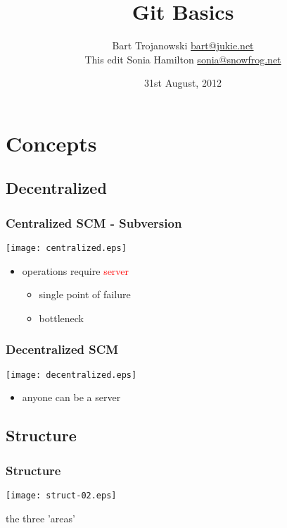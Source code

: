 \documentclass[english]{beamer}
\title{Git Basics}
\author[Bart Trojanowski, Sonia Hamilton]
{Bart Trojanowski \href{mailto:bart@jukie.net}{bart@jukie.net}\\
This edit {Sonia Hamilton \href{mailto:sonia@snowfrog.net}{sonia@snowfrog.net}}}
\institute{Jukie Networks Inc.}
\date{31st August, 2012}
\newcommand{\mysection}[2]{%
  \hypertarget{#2}{}%
  \section{#1}%
  \label{#2}%
}
\newcommand{\mysubsection}[2]{%
  \hypertarget{#2}{}%
  \subsection{#1}%
  \label{#2}%
}
\begin{document}
\label{header}\hypertarget{header}{}
\frame{\maketitle}

\mysection{Concepts}{_concepts}
\mysubsection{Decentralized}{concepts:decentralized}

\begin{frame}
\frametitle{Centralized SCM - Subversion}
\texttt{[image: centralized.eps]}
\begin{itemize}
        \item operations require \textcolor{red}{server}
                \begin{itemize}
                        \item single point of failure
                        \item bottleneck
                \end{itemize}
\end{itemize}
\end{frame}

\begin{frame}
\frametitle{Decentralized SCM}
\texttt{[image: decentralized.eps]}
\begin{itemize}
        \item anyone can be a server
\end{itemize}
\end{frame}

\mysubsection{Structure}{concepts:structure}
\begin{frame}
\frametitle{Structure}

\texttt{[image: struct-02.eps]}
\vspace{\baselineskip}
\begin{center}
        the three 'areas'
\end{center}
\vspace{\textheight}
\end{frame}
\end{document}
